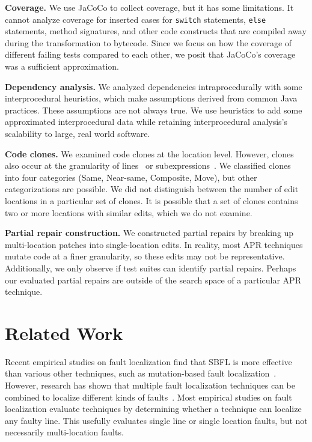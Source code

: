 \documentclass[10pt,journal,compsoc]{IEEEtran}
\begin{document}
\vspace{1ex}
\noindent\textbf{Coverage.}
We use JaCoCo to collect coverage, but it has some
limitations. It cannot analyze coverage for inserted
cases for \texttt{switch} statements, \texttt{else} statements, method
signatures, and other code constructs that are compiled away during the
transformation to bytecode. Since we focus on how the coverage of different
failing tests compared to each other, we posit that JaCoCo's coverage was a
sufficient approximation.

\vspace{1ex}
\noindent\textbf{Dependency analysis.}
We analyzed dependencies intraprocedurally with some interprocedural 
heuristics, which make assumptions derived from common Java practices.
These assumptions are not always true. We use heuristics to add some
approximated interprocedural data while retaining interprocedural 
analysis's scalability to large, real world software.

\vspace{1ex}
\noindent\textbf{Code clones.}
We examined code clones at the location level.  However, clones also occur at the
granularity of lines~\cite{JiaClones} or
subexpressions~\cite{microclones}. We classified clones into four
categories (Same, Near-same, Composite, Move), but other categorizations 
are possible.
%
We did not distinguish between the number
of edit locations in a particular set of clones. It is possible that a set of
clones contains two or more locations with similar edits, which we do not examine. 

\vspace{1ex}
\noindent\textbf{Partial repair construction.}
We constructed partial repairs by breaking up multi-location patches
into single-location edits.
In reality, most APR techniques mutate code at a finer granularity, so
these edits may not be representative.  Additionally, we only observe if test suites
can identify partial repairs. Perhaps our evaluated partial repairs
are outside of the search space of a
particular APR technique.

\section{Related Work}
\label{sec:related}

Recent empirical studies on fault localization find that 
SBFL is more effective than various other techniques, such as 
mutation-based fault localization~\cite{pearson2017evaluating, mut-analysis}.
However, research has shown that multiple fault localization techniques can be
combined to localize different kinds of faults~\cite{zou2019empirical}. Most
empirical studies on fault localization evaluate techniques by determining
whether a technique can localize any faulty line. This usefully evaluates single
line or single location faults, but not necessarily multi-location faults.
\end{document}
